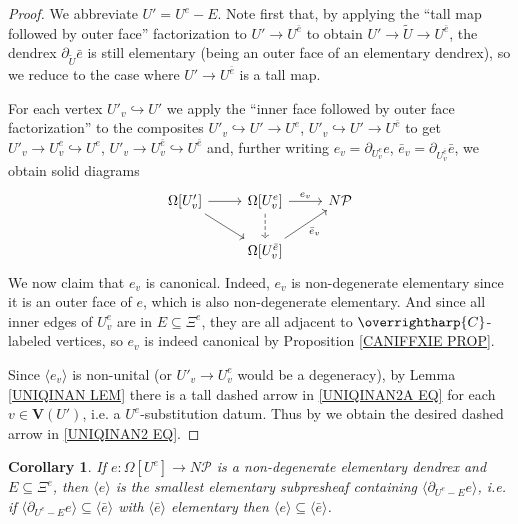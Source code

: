 \documentclass[a4paper,10pt
,draft
]{article}%
\numberwithin{equation}{section}
\numberwithin{figure}{section}
\newtheorem{corollary}[equation]{Corollary}%
\theoremstyle{definition} %
\newcommand{\vect}[1]{\text{\overrightharp{\ensuremath{#1}}}}
\newcommand{\1}{\ensuremath{\mathbbm 1}}%
\begin{document}
\begin{proof}
	We abbreviate $U' = U^e -E$. 
	Note first that, 
	by applying the
	``tall map followed by outer face'' factorization to
	$U' \to U^{\bar{e}}$
	to obtain
	$U' \to \tilde{U} \to U^{\bar{e}}$,
	the dendrex $\partial_{\tilde{U}} \bar{e}$
	is still elementary (being an outer face of an elementary dendrex),
	so we reduce to the case where $U' \to U^{\bar{e}}$ is a tall map.
	
	For each vertex $U'_v \hookrightarrow U'$ we apply the 
	``inner face followed by outer face factorization''
	to the composites
	$U'_{v} \hookrightarrow U' \to U^{e}$,
	$U'_{v} \hookrightarrow U' \to U^{\bar{e}}$
	to get
	$U'_{v} \to U_{v}^e \hookrightarrow U^e$,
	$U'_{v} \to U_{v}^{\bar{e}} \hookrightarrow U^{\bar{e}}$
	and, further writing
	$e_v = \partial_{U^e_v} e$,
	$\bar{e}_v = \partial_{U^{\bar{e}}_v} \bar{e}$, 
	we obtain solid diagrams
	\begin{equation}\label{UNIQINAN2A EQ}
	\begin{tikzcd}
	\Omega[U'_v] \ar{r} \ar{rd}&
	\Omega[U^e_v] \ar{r}{e_v} \ar[dashed]{d} &
	N \mathcal{P}
	\\
	&
	\Omega[U^{\bar{e}}_v] \ar{ru}[swap]{\bar{e}_v} 
	\end{tikzcd}
	\end{equation}
	We now claim that $e_v$ is canonical. Indeed, $e_v$ is non-degenerate elementary since it is an outer face of $e$, which is also non-degenerate elementary. And since all inner edges of $U^e_v$ are in 
	$E \subseteq \Xi^e$, they are all adjacent to $\vect{C}$-labeled vertices, 
	so $e_v$
	is indeed canonical by
	Proposition \ref{CANIFFXIE PROP}.
	
	
	Since $\langle e_v \rangle$ is non-unital
	(or $U'_v \to U_v^e$ would be a degeneracy),
	by Lemma \ref{UNIQINAN LEM} there is a tall dashed arrow in \eqref{UNIQINAN2A EQ} for each $v \in \boldsymbol{V}(U')$,
	i.e. a $U^e$-substitution datum. Thus
	by
	\cite[Prop. 3.41]{BP_geo}
	we obtain the desired dashed arrow in \eqref{UNIQINAN2 EQ}.
\end{proof}



\begin{corollary}\label{MINELEMSH COR}
	If $e \colon \Omega[U^e] \to N \mathcal{P}$ is a non-degenerate elementary dendrex
	and $E \subseteq \Xi^e$,
	then 
	$\langle e\rangle$ is the smallest elementary subpresheaf
	containing $\langle \partial_{U^e - E} e\rangle$,
	i.e. if 
	$\langle \partial_{U^e - E} e\rangle
	\subseteq \langle \bar{e} \rangle$
	with $\langle \bar{e} \rangle$
	elementary then 
	$\langle e\rangle
	\subseteq \langle \bar{e} \rangle$.
\end{corollary}
\end{document}
